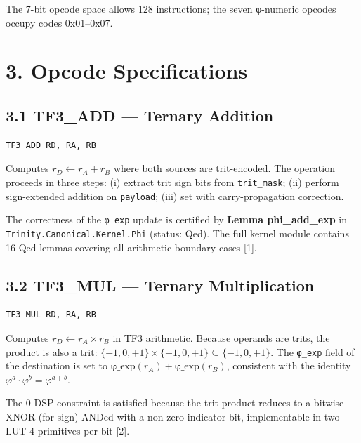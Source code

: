 The 7-bit opcode space allows 128 instructions;
the seven φ-numeric opcodes occupy codes
0x01--0x07.

\section{3. Opcode
Specifications}\label{fa_26:opcode-specifications}

\subsection{3.1 TF3\_ADD --- Ternary
Addition}\label{fa_26:tf3_add-ternary-addition}

\begin{verbatim}
TF3_ADD RD, RA, RB
\end{verbatim}

Computes \(r_D \leftarrow r_A + r_B\) where both
sources are trit-encoded. The operation proceeds
in three steps: (i) extract trit sign bits from
\texttt{trit\_mask}; (ii) perform sign-extended
addition on \texttt{payload}; (iii) set
with carry-propagation correction.

The correctness of the \texttt{φ\_exp} update is
certified by \textbf{Lemma phi\_add\_exp} in
\texttt{Trinity.Canonical.Kernel.Phi} (status:
Qed). The full kernel module contains 16 Qed
lemmas covering all arithmetic boundary cases
[1].

\subsection{3.2 TF3\_MUL --- Ternary
Multiplication}\label{fa_26:tf3_mul-ternary-multiplication}

\begin{verbatim}
TF3_MUL RD, RA, RB
\end{verbatim}

Computes \(r_D \leftarrow r_A \times r_B\) in TF3
arithmetic. Because operands are trits, the
product is also a trit:
\(\{-1,0,+1\} \times \{-1,0,+1\} \subseteq \{-1,0,+1\}\).
The \texttt{φ\_exp} field of the destination is
set to
\(\text{φ\_exp}(r_A) + \text{φ\_exp}(r_B)\),
consistent with the identity
\(\varphi^a \cdot \varphi^b = \varphi^{a+b}\).

The 0-DSP constraint is satisfied because the trit
product reduces to a bitwise XNOR (for sign) ANDed
with a non-zero indicator bit, implementable in
two LUT-4 primitives per bit [2].

